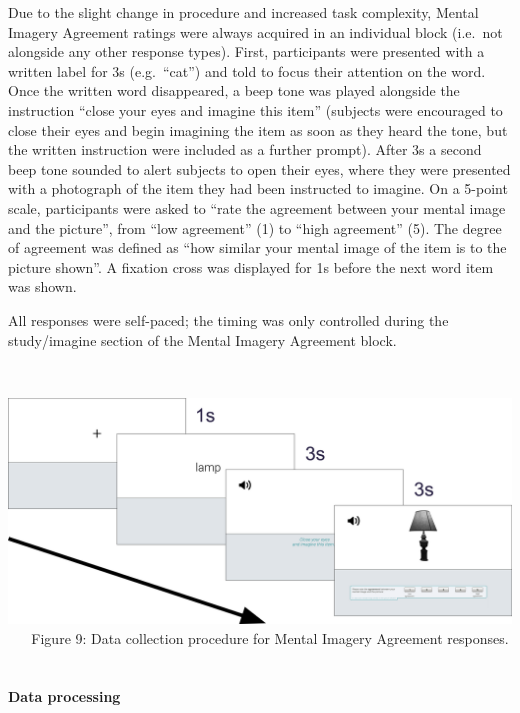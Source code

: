 \documentclass[
  11pt,
]{article}
\begin{document}
Due to the slight change in procedure and increased task complexity,
Mental Imagery Agreement ratings were always acquired in an individual
block (i.e.~not alongside any other response types). First, participants
were presented with a written label for 3s (e.g.~``cat'') and told to
focus their attention on the word. Once the written word disappeared, a
beep tone was played alongside the instruction ``close your eyes and
imagine this item'' (subjects were encouraged to close their eyes and
begin imagining the item as soon as they heard the tone, but the written
instruction were included as a further prompt). After 3s a second beep
tone sounded to alert subjects to open their eyes, where they were
presented with a photograph of the item they had been instructed to
imagine. On a 5-point scale, participants were asked to ``rate the
agreement between your mental image and the picture'', from ``low
agreement'' (1) to ``high agreement'' (5). The degree of agreement was
defined as ``how similar your mental image of the item is to the picture
shown''. A fixation cross was displayed for 1s before the next word item
was shown.

All responses were self-paced; the timing was only controlled during the
study/imagine section of the Mental Imagery Agreement block.

~ ~

\includegraphics[width=1\linewidth]{./resources/images/procedure} ~ ~
Figure 9: Data collection procedure for Mental Imagery Agreement
responses. ~ ~

\hypertarget{data-processing-1}{%
\paragraph{Data processing}\label{data-processing-1}}
\end{document}
